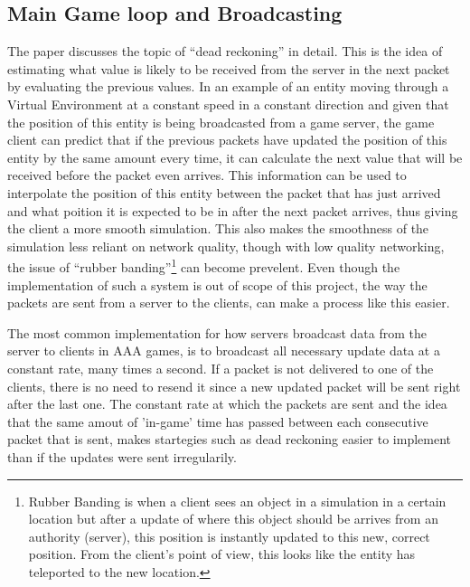 \subsection{Main Game loop and Broadcasting}
The paper  discusses the topic of ``dead reckoning'' in detail. This is the idea of estimating what value is likely to be received from the server in the next packet by evaluating the previous values. In an example of an entity moving through a Virtual Environment at a constant speed in a constant direction and given that the position of this entity is being broadcasted from a game server, the game client can predict that if the previous packets have updated the position of this entity by the same amount every time, it can calculate the next value that will be received before the packet even arrives. This information can be used to interpolate the position of this entity between the packet that has just arrived and what poition it is expected to be in after the next packet arrives, thus giving the client a more smooth simulation. This also makes the smoothness of the simulation less reliant on network quality, though with low quality networking, the issue of ``rubber banding''\footnote{Rubber Banding is when a client sees an object in a simulation in a certain location but after a update of where this object should be arrives from an authority (server), this position is instantly updated to this new, correct position. From the client's point of view, this looks like the entity has teleported to the new location.} can become prevelent. Even though the implementation of such a system is out of scope of this project, the way the packets are sent from a server to the clients, can make a process like this easier.

The most common implementation for how servers broadcast data from the server to clients in AAA games, is to broadcast all necessary update data at a constant rate, many times a second. If a packet is not delivered to one of the clients, there is no need to resend it since a new updated packet will be sent right after the last one. The constant rate at which the packets are sent and the idea that the same amout of 'in-game' time has passed between each consecutive packet that is sent, makes startegies such as dead reckoning easier to implement than if the updates were sent irregularily.

